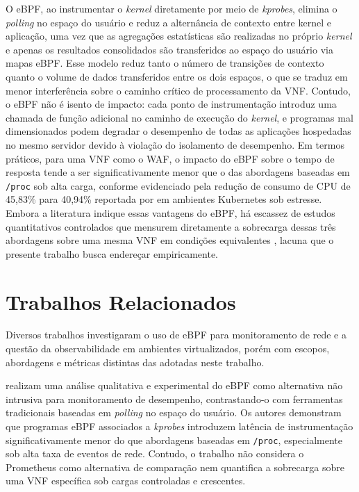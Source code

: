 O eBPF, ao instrumentar o \textit{kernel} diretamente por meio de \textit{kprobes}, elimina o \textit{polling} no espaço do usuário e reduz a alternância de contexto entre kernel e aplicação, uma vez que as agregações estatísticas são realizadas no próprio \textit{kernel} e apenas os resultados consolidados são transferidos ao espaço do usuário via mapas eBPF. Esse modelo reduz tanto o número de transições de contexto quanto o volume de dados transferidos entre os dois espaços, o que se traduz em menor interferência sobre o caminho crítico de processamento da VNF. Contudo, o eBPF não é isento de impacto: cada ponto de instrumentação introduz uma chamada de função adicional no caminho de execução do \textit{kernel}, e programas mal dimensionados podem degradar o desempenho de todas as aplicações hospedadas no mesmo servidor devido à violação do isolamento de desempenho. Em termos práticos, para uma VNF como o WAF, o impacto do eBPF sobre o tempo de resposta tende a ser significativamente menor que o das abordagens baseadas em \texttt{/proc} sob alta carga, conforme evidenciado pela redução de consumo de CPU de 45,83\% para 40,94\% reportada por  em ambientes Kubernetes sob estresse. Embora a literatura indique essas vantagens do eBPF, há escassez de estudos quantitativos controlados que mensurem diretamente a sobrecarga dessas três abordagens sobre uma mesma VNF em condições equivalentes \cite{usman_observability_2022}, lacuna que o presente trabalho busca endereçar empiricamente.


\section{Trabalhos Relacionados}
\label{sec:trabalhos_relacionados}

Diversos trabalhos investigaram o uso de eBPF para monitoramento de rede e a questão da observabilidade em ambientes virtualizados, porém com escopos, abordagens e métricas distintas das adotadas neste trabalho.

 realizam uma análise qualitativa e experimental do eBPF como alternativa não intrusiva para monitoramento de desempenho, contrastando-o com ferramentas tradicionais baseadas em \textit{polling} no espaço do usuário. Os autores demonstram que programas eBPF associados a \textit{kprobes} introduzem latência de instrumentação significativamente menor do que abordagens baseadas em \texttt{/proc}, especialmente sob alta taxa de eventos de rede. Contudo, o trabalho não considera o Prometheus como alternativa de comparação nem quantifica a sobrecarga sobre uma VNF específica sob cargas controladas e crescentes.

